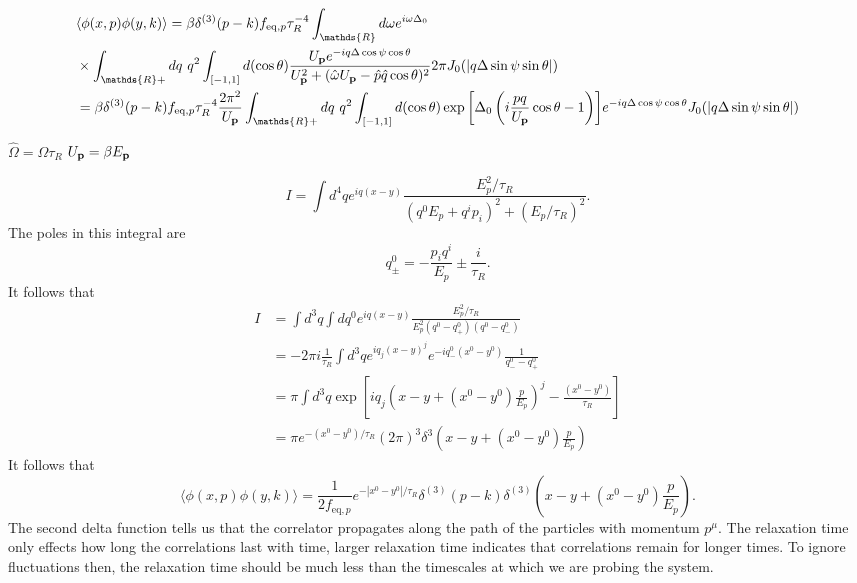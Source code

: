 \documentclass[aps,prd,preprint,nofootinbib,amsmath,amssymb,showpacs,longbibliography,singlecolumn,superscriptaddress,10pt]{revtex4-1}
\theoremstyle{plain}
\theoremstyle{definition}
\begin{document}
\begin{equation}
\begin{aligned}
 & 
 \langle \phi(x,p) \phi(y,k)  \rangle 
=
\beta \delta^{(3)}(p-k) f_{\mathrm{eq},p} \tau_{R}^{-4} \int_{\mathds{R}} d\omega  e^{i \omega \Delta_{0}} 
\\
&
\times \int_{\mathds{R}+} dq \ q^{2} \int_{[-1,1]} d(\cos \theta)
\frac{U_{\bf p} e^{-i q \Delta \cos \psi \cos \theta}}{U_{\bf p}^{2} + (\hat{\omega} U_{\bf p} - \hat{p} \Hat{q} \cos{\theta})^{2} } 2 \pi J_{0}(|q \Delta \sin \psi \sin \theta|)
\\
&
=
\beta \delta^{(3)}(p-k) f_{\mathrm{eq},p} \tau_{R}^{-4}  
\frac{2 \pi^{2}}{U_{\bf p}}
\int_{\mathds{R}+} dq \ q^{2} \int_{[-1,1]} d(\cos \theta)
 \exp{\left[\Delta_{0} \left( i \frac{p q}{U_{\bf p}} \cos \theta - 1\right) \right]}
 e^{-i q \Delta \cos \psi \cos \theta}  J_{0}(|q \Delta \sin \psi \sin \theta|)
\end{aligned}    
\end{equation}

$\hat{\Omega} = \Omega \tau_{R}$ $U_{\bf p} = \beta E_{\bf p}$



\begin{equation}
    I = \int d^4q e^{iq(x-y)} \frac{E_p^2 / \tau_R}{(q^0 E_p + q^i p_i)^2 + (E_p / \tau_R)^2} .
\end{equation}
The poles in this integral are
\begin{equation}
    q^0_{\pm} = - \frac{p_i q^i}{E_p} \pm \frac{i}{\tau_R} .
\end{equation}
It follows that
\begin{equation}
\begin{split}
    I & = \int d^3q \int dq^0 e^{iq(x-y)} \frac{E_p^2 / \tau_R}{E_p^2(q^0 - q^0_+) (q^0 - q^0_-)} \\
    & = -2\pi i \frac{1}{\tau_R} \int d^3q e^{i q_j (x-y)^j} e^{-i q_-^0 (x^0 - y^0)} \frac{1}{q_-^0 - q_+^0} \\
    & = \pi \int d^3q \exp \left[ i q_j \left( x - y + (x^0 - y^0) \frac{p}{E_p} \right)^j - \frac{(x^0 - y^0)}{\tau_R} \right]  \\
    & = \pi e^{-(x^0-y^0)/\tau_R} (2\pi)^3 \delta^3\left( x - y + (x^0 - y^0) \frac{p}{E_p} \right)
\end{split}
\end{equation}
It follows that
\begin{equation}
    \langle \phi(x,p) \phi(y,k) \rangle = \frac{1}{2 f_{\mathrm{eq},p}} e^{-|x^0-y^0|/\tau_R} \delta^{(3)}(p-k) \delta^{(3)} \left( x - y + (x^0 - y^0) \frac{p}{E_p} \right) .
\end{equation}
The second delta function tells us that the correlator propagates along the path of the particles with momentum $p^{\mu}$. The relaxation time only effects how long the correlations last with time, larger relaxation time indicates that correlations remain for longer times. To ignore fluctuations then, the relaxation time should be much less than the timescales at which we are probing the system. 
\end{document}
